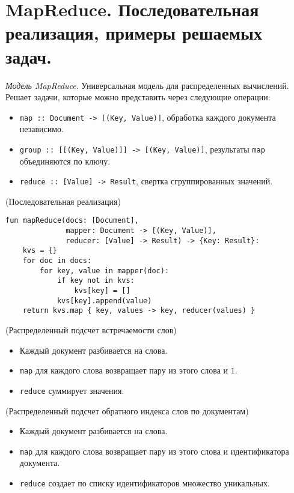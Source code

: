 \section{MapReduce. Последовательная реализация, примеры решаемых задач.}

\begin{definition}
    \textit{Модель MapReduce}. Универсальная модель для распределенных
    вычислений. Решает задачи, которые можно представить через следующие
    операции:
    \begin{itemize}
      \item \texttt{map :: Document -> [(Key, Value)]}, обработка каждого
        документа независимо.
      \item \texttt{group :: [[(Key, Value)]] -> [(Key, Value)]},
        результаты \texttt{map} объединяются по ключу.
      \item \texttt{reduce :: [Value] -> Result}, свертка сгруппированных
        значений.
    \end{itemize}
\end{definition}


\begin{algorithm}(Последовательная реализация)
  \begin{lstlisting}
fun mapReduce(docs: [Document],
              mapper: Document -> [(Key, Value)],
              reducer: [Value] -> Result) -> {Key: Result}:
    kvs = {}
    for doc in docs:
        for key, value in mapper(doc):
            if key not in kvs:
                kvs[key] = []
            kvs[key].append(value)
    return kvs.map { key, values -> key, reducer(values) }
  \end{lstlisting}
\end{algorithm}

\begin{example}(Распределенный подсчет встречаемости слов)
  \begin{itemize}
    \item Каждый документ разбивается на слова.
    \item \texttt{map} для каждого слова возвращает пару из этого слова и $1$.
    \item \texttt{reduce} суммирует значения.
  \end{itemize}
\end{example}

\begin{example}(Распределенный подсчет обратного индекса слов по документам)
  \begin{itemize}
    \item Каждый документ разбивается на слова.
    \item \texttt{map} для каждого слова возвращает пару из этого слова и
      идентификатора документа.
    \item \texttt{reduce} создает по списку идентификаторов множество
      уникальных.
  \end{itemize}
\end{example}
